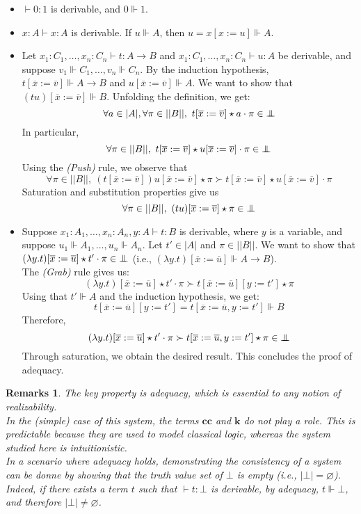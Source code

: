 \documentclass[a4paper,12pt]{article}
\theoremstyle{rmqstyle}
\newtheorem{rmqs}[theo]{Remarks}
\newcommand{\abs}[1]{\lvert#1\rvert}
\newcommand{\abss}[1]{\lvert \lvert#1\rvert \rvert}
\newcommand{\cc}{\mathbf{cc}}
\renewcommand{\k}{\mathbf{k}}
\newcommand{\pole}{{\protect\mathpalette{\protect\polehelper}{\bot}}} \def\polehelper#1#2{\mathrel{\rlap{$#1#2$}\mkern3mu{#1#2}}}
\renewcommand{\bar}{\overline}
\begin{document}
\begin{itemize}
\setlength\itemsep{ -1 em}
\item $\vdash 0 : 1$ is derivable, and $0 \Vdash 1$.\\

\item $x : A \vdash x : A$ is derivable. If $u \Vdash A$, then $u = x[x := u] \Vdash A$.\\

\item Let $x_1 : C_1, \dots, x_n : C_n \vdash t : A \to B$ and $x_1 : C_1, \dots, x_n : C_n \vdash u : A$ be derivable, and suppose $v_1 \Vdash C_1, \dots, v_n \Vdash C_n$. By the induction hypothesis, $t[ \bar{x} := \bar{v}] \Vdash A \to B$ and $u[\bar{x} := \bar{v}] \Vdash A$. We want to show that $(tu)[\bar{x} := \bar{v}] \Vdash B$. Unfolding the definition, we get:
$$\forall a \in \abs{A}, \forall \pi \in \abss{B}, \ t[\bar{x} := \bar{v}] \star a \cdot \pi \in \pole$$
In particular,
$$ \forall \pi \in \abss{B}, \ t[\bar{x} := \bar{v}] \star u[\bar{x} := \bar{v}] \cdot \pi \in \pole$$
Using the \textit{(Push)} rule, we observe that
$$\forall \pi \in \abss{B}, \ (t[\bar{x} := \bar{v}])u[\bar{x} := \bar{v}] \star \pi \succ t[\bar{x} := \bar{v}] \star u[\bar{x} := \bar{v}] \cdot \pi$$
Saturation and substitution properties give us
$$\forall \pi \in \abss{B}, \ (tu)[\bar{x} := \bar{v}] \star \pi \in \pole$$

\item Suppose $x_1 : A_1, \dots, x_n : A_n, y : A \vdash t : B$ is derivable, where $y$ is a variable, and suppose $u_1 \Vdash A_1, \dots, u_n \Vdash A_n$. Let $t' \in \abs{A}$ and $\pi \in \abss{B}$. We want to show that $(\lambda y.t)[\bar{x} := \bar{u}] \star t' \cdot \pi \in \pole$ (i.e., $(\lambda y.t)[\bar{x} := \bar{u}] \Vdash A \to B$).\\
The \textit{(Grab)} rule gives us:
$$(\lambda y.t)[\bar{x} := \bar{u}] \star t' \cdot \pi \succ  t[\bar{x} := \bar{u}][y := t'] \star \pi $$
Using that $t' \Vdash A$ and the induction hypothesis, we get:
$$t[\bar{x} := \bar{u}][y := t'] = t[\bar{x} := \bar{u}, y := t'] \Vdash B$$
Therefore,
$$(\lambda y.t)[\bar{x} := \bar{u}] \star t' \cdot \pi \succ  t[\bar{x} := \bar{u}, y := t'] \star \pi \in \pole$$
Through saturation, we obtain the desired result. This concludes the proof of adequacy.
\end{itemize}

\begin{rmqs} The key property is adequacy, which is essential to any notion of realizability.\\
In the (simple) case of this system, the terms $\cc$ and $\k$ do not play a role. This is predictable because they are used to model classical logic, whereas the system studied here is intuitionistic.\\
In a scenario where adequacy holds, demonstrating the consistency of a system can be donne by showing that the truth value set of $\bot$ is empty (i.e., $\abs{\bot} = \varnothing$). Indeed, if there exists a term $t$ such that $\vdash t : \bot$ is derivable, by adequacy, $t \Vdash \bot$, and therefore $\abs{\bot} \neq \varnothing$.\end{rmqs}
\end{document}
